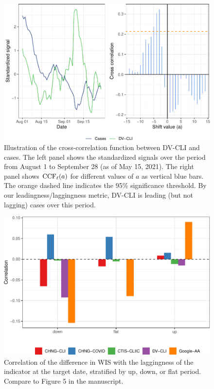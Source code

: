 \documentclass[9pt,twoside,lineno]{pnas-new}
\begin{document}
\clearpage

\begin{figure}

{\centering \includegraphics[width=\textwidth]{fig/ccf-dv-finalized-1} 

}

\caption{Illustration of the cross-correlation function between DV-CLI and cases. The left panel shows the standardized signals over the period from August 1 to September 28 (as of May 15, 2021). The right panel shows $\mathrm{CCF}_{\ell}(a)$ for different values of $a$ as vertical blue bars. The orange dashed line indicates the 95\% significance threshold. By our leadingness/laggingness metric, DV-CLI is leading (but not lagging) cases over this period.}\label{fig:ccf-dv-finalized}
\end{figure}

\clearpage

\begin{figure}

{\centering \includegraphics[width=\textwidth]{fig/lagging-only-1} 

}

\caption{Correlation of the difference in WIS with the laggingness of the indicator at the target date, stratified by up, down, or flat period. Compare to Figure 5 in the manuscript.}\label{fig:lagging-only}
\end{figure}
\end{document}
